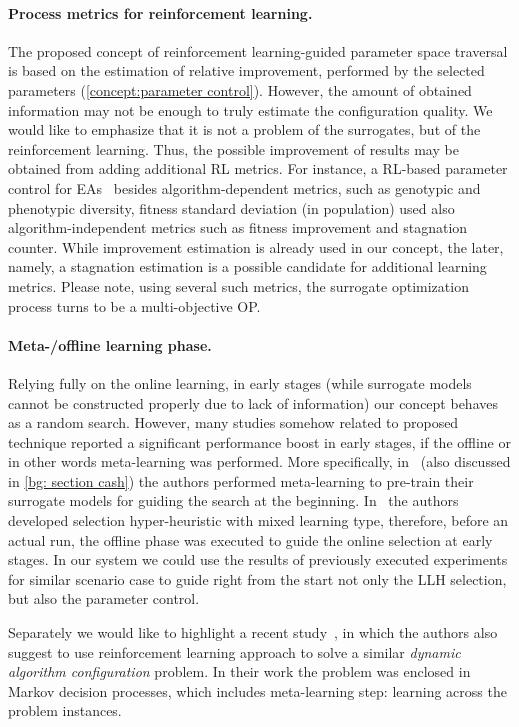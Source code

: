 \paragraph{Process metrics for reinforcement learning.} The proposed concept of reinforcement learning-guided parameter space traversal is based on the estimation of relative improvement, performed by the selected parameters (\cref{concept:parameter control}). However, the amount of obtained information may not be enough to truly estimate the configuration quality. We would like to emphasize that it is not a problem of the surrogates, but of the reinforcement learning. Thus, the possible improvement of results may be obtained from adding additional RL metrics. For instance, a RL-based parameter control for EAs~\cite{karafotias2014generic} besides algorithm-dependent metrics, such as genotypic and phenotypic diversity, fitness standard deviation (in population) used also algorithm-independent metrics such as fitness improvement and stagnation counter. While improvement estimation is already used in our concept, the later, namely, a stagnation estimation is a possible candidate for additional learning metrics. Please note, using several such metrics, the surrogate optimization process turns to be a multi-objective OP.


\paragraph{Meta-/offline learning phase.} Relying fully on the online learning, in early stages (while surrogate models cannot be constructed properly due to lack of information) our concept behaves as a random search. However, many studies somehow related to proposed technique reported a significant performance boost in early stages, if the offline or in other words meta-learning was performed. More specifically, in~\cite{feurer2015efficient} (also discussed in \cref{bg: section cash}) the authors performed meta-learning to pre-train their surrogate models for guiding the search at the beginning. In~\cite{uludaug2013hybrid} the authors developed selection hyper-heuristic with mixed learning type, therefore, before an actual run, the offline phase was executed to guide the online selection at early stages. In our system we could use the results of previously executed experiments for similar scenario case to guide right from the start not only the LLH selection, but also the parameter control. 

Separately we would like to highlight a recent study~\cite{biedenkapp-ecai20}, in which the authors also suggest to use reinforcement learning approach to solve a similar \emph{dynamic algorithm configuration} problem. In their work the problem was enclosed in Markov decision processes, which includes meta-learning step: learning across the problem instances.


